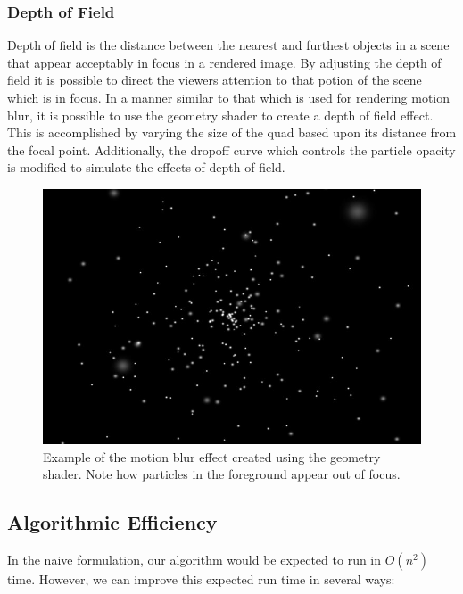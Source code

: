 \documentclass{article}
\begin{document}
\subsubsection{Depth of Field}

Depth of field is the distance between the nearest and furthest objects in a scene that appear acceptably in focus in a rendered image. By adjusting the depth of field it is possible to direct the viewers attention to that potion of the scene which is in focus. In a manner similar to that which is used for rendering motion blur, it is possible to use the geometry shader to create a depth of field effect. This is accomplished by varying the size of the quad based upon its distance from the focal point. Additionally, the dropoff curve which controls the particle opacity is modified to simulate the effects of depth of field.

\begin{figure}[h!]
	\centering
	\includegraphics[scale=0.5]{Images/FuryDepthOfField}
	\caption{Example of the motion blur effect created using the geometry shader. Note how particles in the foreground appear out of focus.}
\end{figure}

\subsection{Algorithmic Efficiency}

In the naive formulation, our algorithm would be expected to run in $O(n^{2})$ time. However, we can improve this expected run time in several ways:
\end{document}

